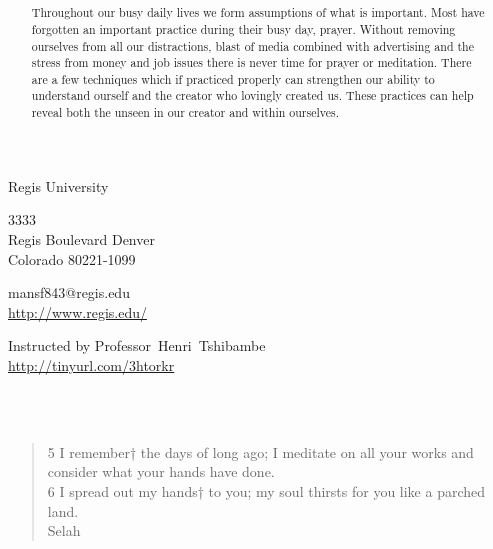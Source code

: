 \documentclass[11pt,a4paper]{scrartcl} %
\begin{document}
\pagecolor{Sepia!20}
\begin{cv}{}
        \begin{cvlist}{\textcolor{brown}{}}\label{PersDat}  
            \item   Regis University
            \item   3333\\
                    Regis Boulevard Denver \\	
                    Colorado 80221-1099
            \item   mansf843@regis.edu\\				
                    \url{http://www.regis.edu/}				
        \end{cvlist}
        \begin{cvlist}{}\label{irgendwas}
            \item Instructed by Professor~Henri~Tshibambe\\
             \url{http://tinyurl.com/3htorkr}
        \end{cvlist}
    \end{cv}
\clearpage
\noindent
\begin{center}
\textcolor{Maroon}{}\\
\textcolor{Maroon}{}\\
\begin{verse}
5 I remember† the days of long ago; I meditate on all your works and consider what your hands have done. \\
6 I spread out my hands† to you; my soul thirsts for you like a parched land.\\ 
Selah 
\end{verse}
\end{center}

\clearpage
\title{\textcolor{Maroon}{\rmfamily\normalfont{}}}
    \author{\textcolor{brown}{}}
    \date{} %
    
    \maketitle
    
 \begin{abstract}
Throughout our busy daily lives we form assumptions of what is important. Most have forgotten an important practice during their busy day, prayer. Without removing ourselves from all our distractions, blast of media combined with advertising and the stress from money and job issues there is never time for prayer or meditation. There are a few techniques which if practiced properly can strengthen our ability to understand ourself and the creator who lovingly created us. These practices can help reveal both the unseen in our creator and within ourselves.
 \end{abstract}
       
\end{document}
